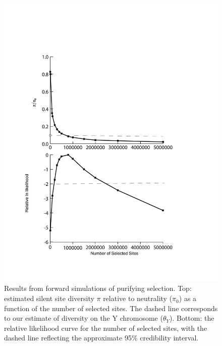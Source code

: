 \documentclass[9pt,twocolumn,twoside,lineno]{gsajnl}
\begin{document}
\begin{figure}[t!]
\centering
\noindent
\includegraphics[width=\linewidth]{figure3.jpg}
\caption{Results from forward simulations of purifying selection. Top: estimated silent site diversity $\pi$ relative to neutrality ($\pi_{0}$) as a function of the number of selected sites. The dashed line corresponds to our estimate of diversity on the Y chromosome ($\theta_{Y}$). Bottom: the relative likelihood curve for the number of selected sites, with the dashed line reflecting the approximate 95\% credibility interval.
}
\label{fig:selectedsites}
\end{figure}
\end{document}
